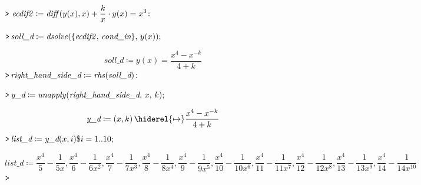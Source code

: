 \documentclass{article}
\begin{document}
{}
\mapleinput
{$ \displaystyle \texttt{>\,} \,\mathit{ecdif2} \coloneqq \mathit{diff} (y (x),x)+\frac{k}{x}\cdot y (x)=x^{3}\colon  $}

\mapleinput
{$ \displaystyle \texttt{>\,} \textit{soll\_d} \coloneqq \mathit{dsolve} (\{\mathit{ecdif2} ,\,\textit{cond\_in} \},\,y (x)); $}

\begin{dmath}\label{(35)}
\textit{soll\_d} \coloneqq y \! \left(x \right)=\frac{x^{4}-x^{-k}}{4+k}
\end{dmath}
\mapleinput
{$ \displaystyle \texttt{>\,} \textit{right\_hand\_side\_d} \coloneqq \mathit{rhs} (\textit{soll\_d})\colon  $}

\mapleinput
{$ \displaystyle \texttt{>\,} \textit{y\_d} \coloneqq \mathit{unapply} (\textit{right\_hand\_side\_d} ,\,x ,\,k); $}

\begin{dmath}\label{(36)}
\textit{y\_d} \coloneqq \left(x ,k \right)\hiderel{\mapsto }\frac{x^{4}-x^{-k}}{4+k}
\end{dmath}
\mapleinput
{$ \displaystyle \texttt{>\,} \textit{list\_d} \coloneqq \textit{y\_d} (x ,i)\$ i =1..10; $}

\begin{dmath}\label{(37)}
\textit{list\_d} \coloneqq \frac{x^{4}}{5}-\frac{1}{5 x},\frac{x^{4}}{6}-\frac{1}{6 x^{2}},\frac{x^{4}}{7}-\frac{1}{7 x^{3}},\frac{x^{4}}{8}-\frac{1}{8 x^{4}},\frac{x^{4}}{9}-\frac{1}{9 x^{5}},\frac{x^{4}}{10}-\frac{1}{10 x^{6}},\frac{x^{4}}{11}-\frac{1}{11 x^{7}},\frac{x^{4}}{12}-\frac{1}{12 x^{8}},\frac{x^{4}}{13}-\frac{1}{13 x^{9}},\frac{x^{4}}{14}-\frac{1}{14 x^{10}}
\end{dmath}
\mapleinput
{$ \displaystyle \texttt{>\,} \, $}
\end{document}
